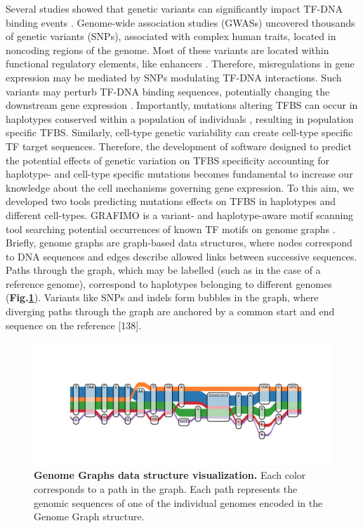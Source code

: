 \documentclass[a4paper, titlepage, openright]{book}
\begin{document}
Several studies showed that genetic variants can significantly impact TF-DNA binding events \citep{de2006regulatory,weinhold2014genome,guo2018mutation}. Genome-wide association studies (GWASs) uncovered thousands of genetic variants (SNPs), associated with complex human traits, located in noncoding regions of the genome. Most of these variants are located within functional regulatory elements, like enhancers \citep{maurano2012systematic}. Therefore, misregulations in gene expression may be mediated by SNPs modulating TF-DNA interactions. Such variants may perturb TF-DNA binding sequences, potentially changing the downstream gene expression \citep{deplancke2016genetics}. Importantly, mutations altering TFBS can occur in haplotypes conserved within a population of individuals \citep{kasowski2010variation}, resulting in population specific TFBS. Similarly, cell-type genetic variability can create cell-type specific TF target sequences. Therefore, the development of software designed to predict the potential effects of genetic variation on TFBS specificity accounting for haplotype- and cell-type specific mutations becomes fundamental to increase our knowledge about the cell mechanisms governing gene expression. To this aim, we developed two tools predicting mutations effects on TFBS in haplotypes and different cell-types. GRAFIMO \citep{tognon2021grafimo} is a variant- and haplotype-aware motif scanning tool searching potential occurrences of known TF motifs on genome graphs \citep{paten2017genome}. Briefly, genome graphs are graph-based data structures, where nodes correspond to DNA sequences and edges describe allowed links between successive sequences. Paths through the graph, which may be labelled (such as in the case of a reference genome), correspond to haplotypes belonging to different genomes \citep{siren2020haplotype} (\textbf{Fig.\ref{fig:vg}}).
Variants like SNPs and indels form bubbles in the graph, where diverging paths through the graph are anchored by a common start and end sequence on the reference
[138]. 
\begin{figure}
	\centering
	\includegraphics[width=\textwidth]{figures/vg.jpg}
	\caption[Genome Graphs data structure visualization]{\textbf{Genome Graphs data structure visualization.}  Each color corresponds to a path in the graph. Each path represents the genomic sequences of one of the individual genomes encoded in the Genome Graph structure.}
	\label{fig:vg}
\end{figure} 
\end{document}
